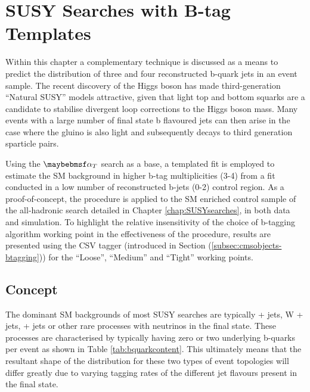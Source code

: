 \chapter{SUSY Searches with B-tag Templates}
\label{chap:templatemethod}


Within this chapter a complementary technique is discussed as a means to predict the distribution of three and four reconstructed b-quark jets in an event sample. The recent discovery of the Higgs boson has made third-generation ``Natural \ac{SUSY}'' models attractive, given that light top and bottom squarks are a candidate to stabilise divergent loop corrections to the Higgs boson mass. Many events with a large number of final state b flavoured jets can then arise in the case where the gluino is also light and subsequently decays to third generation sparticle pairs.

Using the $\alphat$ search as a base, a templated fit is employed to estimate the \ac{SM} background in higher b-tag multiplicities (3-4) from a fit conducted in a low number of reconstructed b-jets (0-2) control region. As a proof-of-concept, the procedure is applied to the SM enriched \mupjets control sample of the \alphat all-hadronic search detailed in Chapter \ref{chap:SUSYsearches}, in both data and simulation. To highlight the relative insensitivity of the choice of b-tagging algorithm working point in the effectiveness of the procedure, results are presented using the \ac{CSV} tagger (introduced in Section (\ref{subsec:cmsobjects-btagging})) for the ``Loose'', ``Medium'' and ``Tight'' working points.

\section{Concept}
\label{sec:templateconcept}

The dominant \ac{SM} backgrounds of most \ac{SUSY} searches are typically \ttbar + jets, W + jets, \zinv + jets or other rare processes with neutrinos in the final state. These processes are characterised by typically having zero or two underlying b-quarks per event as shown in Table \ref{tab:bquarkcontent}. This ultimately means that the resultant shape of the \nbreco distribution for these two types of event topologies will differ greatly due to varying tagging rates of the different jet flavours present in the final state.  

